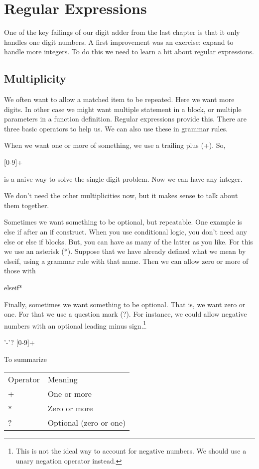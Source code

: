 \chapter{Regular Expressions}

One of the key failings of our digit adder from the last chapter is that
it only handles one digit numbers. A first improvement was an exercise:
expand to handle more integers. To do this we need to learn a bit about
regular expressions.

\section{Multiplicity}

We often want to allow a matched item to be repeated. Here we want more
digits. In other case we might want multiple statement in a block,
or multiple parameters in a function definition. Regular expressions
provide this. There are three basic operators to help us. We can also
use these in grammar rules.

When we want one or more of something, we use a trailing plus (+). So,

    [0-9]+

is a naive way to solve the single digit problem. Now we can have any
integer.

We don't need the other multiplicities now, but it makes sense to talk
about them together.

Sometimes we want something to be optional, but repeatable. One example
is else if after an if construct. When you use conditional logic, you don't need
any else or else if blocks. But, you can have as many of the latter
as you like. For this we use an asterisk (*). Suppose that we have
already defined what we mean by elseif, using a grammar rule with that name.
Then we can allow zero or more of those with

    elseif*

Finally, sometimes we want something to be optional. That is, we want
zero or one. For that we use a question mark (?). For instance, we could
allow negative numbers with an optional leading minus sign.\footnote{
This is not the ideal way to account for negative numbers. We should use
a unary negation operator instead.}

    '-'? [0-9]+

To summarize

\begin{tabular}{l l}
    Operator &      Meaning \\
    +        &      One or more \\
    \verb+*+ &      Zero or more \\
    ?        &      Optional (zero or one) \\
\end{tabular}

